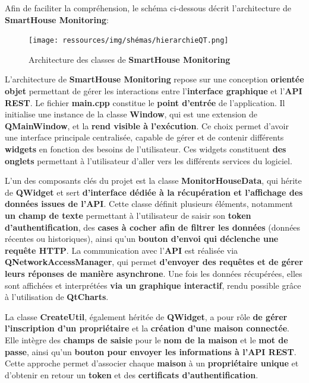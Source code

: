 \documentclass[10pt, a4paper]{report}
\begin{document}
	Afin de faciliter la compréhension, le schéma ci-dessous décrit l'architecture de \textbf{SmartHouse Monitoring}:
		
	\begin{figure}[h!]
		\centering
		\texttt{[image: ressources/img/shémas/hierarchieQT.png]}
		\caption{Architecture des classes de \textbf{SmartHouse Monitoring}}
		\label{fig:hierarchieQT}
	\end{figure}
	
	L’architecture de \textbf{SmartHouse Monitoring} repose sur une conception \textbf{orientée objet} permettant de gérer les interactions entre l’\textbf{interface graphique} et l’\textbf{API REST}. Le fichier \textbf{main.cpp} constitue le \textbf{point d’entrée} de l’application. Il initialise une instance de la classe \textbf{Window}, qui est une extension de \textbf{QMainWindow}, et la \textbf{rend visible à l’exécution}. Ce choix permet d’avoir une interface principale centralisée, capable de gérer et de contenir différents \textbf{widgets} en fonction des besoins de l’utilisateur. Ces widgets constituent \textbf{des onglets} permettant à l'utilisateur d'aller vers les différents services du logiciel.
	
	L’un des composants clés du projet est la classe \textbf{MonitorHouseData}, qui hérite de \textbf{QWidget} et sert \textbf{d’interface dédiée à la récupération et l’affichage des données issues de l’API}. Cette classe définit plusieurs éléments, notamment \textbf{un champ de texte} permettant à l’utilisateur de saisir son \textbf{token d’authentification}, des \textbf{cases à cocher afin de filtrer les données} (données récentes ou historiques), ainsi qu’un \textbf{bouton d’envoi qui déclenche une requête HTTP}. La communication avec l’\textbf{API} est réalisée via \textbf{QNetworkAccessManager}, qui permet \textbf{d’envoyer des requêtes et de gérer leurs réponses de manière asynchrone}. Une fois les données récupérées, elles sont affichées et interprétées \textbf{via un graphique interactif}, rendu possible grâce à l’utilisation de \textbf{QtCharts}.
	
	La classe \textbf{CreateUtil}, également héritée de \textbf{QWidget}, a pour rôle\textbf{ de gérer l’inscription d’un propriétaire} et la \textbf{création d’une maison connectée}. Elle intègre des \textbf{champs de saisie} pour le\textbf{ nom de la maison} et le \textbf{mot de passe}, ainsi qu’un \textbf{bouton pour envoyer les informations à l’API REST}. Cette approche permet d’associer chaque \textbf{maison} à un \textbf{propriétaire unique} et d’obtenir en retour un \textbf{token} et des\textbf{ certificats d’authentification}.
	
\end{document}
